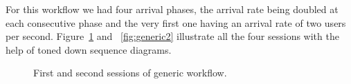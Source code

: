 For this workflow we had four arrival phases, the arrival rate being doubled at each consecutive phase and the very first one having an arrival rate of two users per second. Figure~\ref{fig:generic1} and ~\ref{fig:generic2} illustrate all the four sessions with the help of toned down sequence diagrams.

\begin{figure}

\caption{First and second sessions of generic workflow.}\label{fig:generic1}
\end{figure}

